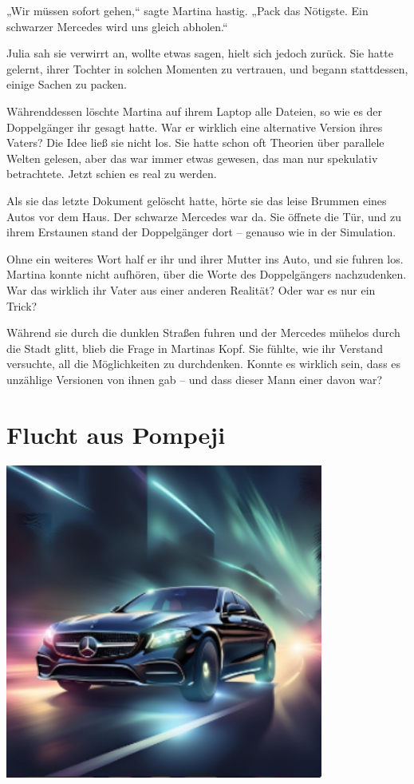 \documentclass[
]{article}
\begin{document}
„Wir müssen sofort gehen,`` sagte Martina hastig. „Pack das Nötigste.
Ein schwarzer Mercedes wird uns gleich abholen.``

Julia sah sie verwirrt an, wollte etwas sagen, hielt sich jedoch zurück.
Sie hatte gelernt, ihrer Tochter in solchen Momenten zu vertrauen, und
begann stattdessen, einige Sachen zu packen.

Währenddessen löschte Martina auf ihrem Laptop alle Dateien, so wie es
der Doppelgänger ihr gesagt hatte. War er wirklich eine alternative
Version ihres Vaters? Die Idee ließ sie nicht los. Sie hatte schon oft
Theorien über parallele Welten gelesen, aber das war immer etwas
gewesen, das man nur spekulativ betrachtete. Jetzt schien es real zu
werden.

Als sie das letzte Dokument gelöscht hatte, hörte sie das leise Brummen
eines Autos vor dem Haus. Der schwarze Mercedes war da. Sie öffnete die
Tür, und zu ihrem Erstaunen stand der Doppelgänger dort -- genauso wie
in der Simulation.

Ohne ein weiteres Wort half er ihr und ihrer Mutter ins Auto, und sie
fuhren los. Martina konnte nicht aufhören, über die Worte des
Doppelgängers nachzudenken. War das wirklich ihr Vater aus einer anderen
Realität? Oder war es nur ein Trick?

Während sie durch die dunklen Straßen fuhren und der Mercedes mühelos
durch die Stadt glitt, blieb die Frage in Martinas Kopf. Sie fühlte, wie
ihr Verstand versuchte, all die Möglichkeiten zu durchdenken. Konnte es
wirklich sein, dass es unzählige Versionen von ihnen gab -- und dass
dieser Mann einer davon war?

\section{Flucht aus Pompeji}\label{flucht-aus-pompeji}

\includegraphics[width=4.11614in,height=4.08663in]{media/image15.png}
\end{document}
